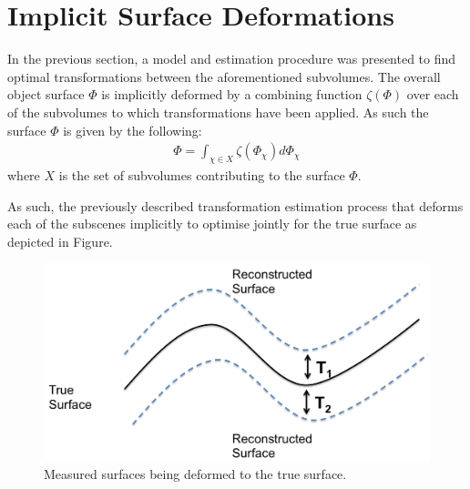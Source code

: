 \section{Implicit Surface Deformations}
In the previous section, a model and estimation procedure was presented to find optimal transformations between the aforementioned subvolumes.
The overall object surface $\Phi$ is implicitly deformed by a combining function $\zeta(\Phi)$ over each of the subvolumes to which transformations have been applied.
As such the surface $\Phi$ is given by the following:
\begin{equation}
\begin{split}
\Phi = \int_{\chi \in X} \zeta(\Phi_{\chi}) d \Phi_{\chi}
\end{split}
\end{equation}
where $X$ is the set of subvolumes contributing to the surface $\Phi$.

As such, the previously described transformation estimation process that deforms each of the subscenes implicitly to optimise jointly for the true 
surface as depicted in Figure.
\begin{figure}[!t]
	\centering
	\includegraphics[scale=0.25]{deformation.png}
	\caption{Measured surfaces being deformed to the true surface.}
	\label{deformationDiagram}
\end{figure}


